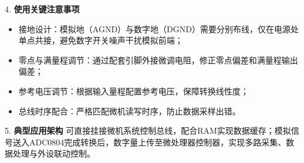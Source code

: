 4. \textbf{使用关键注意事项}
\begin{itemize}
\item 接地设计：模拟地（AGND）与数字地（DGND）需要分别布线，仅在电源处单点共接，避免数字开关噪声干扰模拟前端；
\item 零点与满量程调节：通过配套引脚外接微调电阻，修正零点偏差和满量程输出偏差；
\item 参考电压调节：根据输入量程配置参考电压，保障转换线性度；
\item 总线时序配合：严格匹配微机读写时序，防止数据采样出错。
\end{itemize}

5. \textbf{典型应用架构}
可直接挂接微机系统控制总线，配合RAM实现数据缓存；模拟信号送入ADC0804完成转换后，数字量上传至微处理器控制器，实现多路采集、数据处理与外设联动控制。